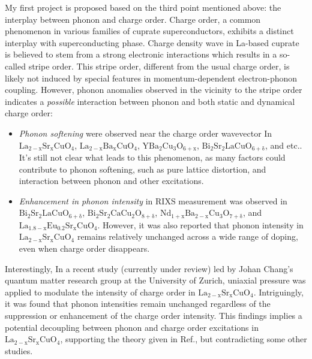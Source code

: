 \documentclass[11pt]{article}
\begin{document}
My first project is proposed based on the third point mentioned above: the interplay between phonon and charge order. Charge order, a common phenomenon in various families of cuprate superconductors, exhibits a distinct interplay with superconducting phase. Charge density wave in La-based cuprate is believed to stem from a strong electronic interactions which results in a so-called stripe order\cite{harriger_stripe_nodate,tranquada_evidence_1995,choi_disentangling_2020}. This stripe order, different from the usual charge order, is likely not induced by special features in momentum-dependent electron-phonon coupling. However, phonon anomalies observed in the vicinity to the stripe order indicates a \textit{possible} interaction between phonon and both static and dynamical charge order: 
\begin{itemize}
\item \textit{Phonon softening}  were observed near the charge order wavevector In $\mathrm{La_{2-x}Sr_{x}CuO_{4}}$\cite{lin_strongly_2020, wang_charge_2021, huang_quantum_2021}, $\mathrm{La_{2-x}Ba_{x}CuO_{4}}$\cite{miao_incommensurate_2018}, $\mathrm{YBa_{2}Cu_{3}O_{6+x}}$\cite{tacon_inelastic_2014}, $\mathrm{Bi_{2}Sr_{2}LaCuO_{6+\delta}}$\cite{li_multiorbital_2020}, and etc.. It's still not clear what leads to this phenomenon, as many factors could contribute to phonon softening, such as pure lattice distortion\cite{lin_strongly_2020}, and interaction between phonon and other excitations.  
\item \textit{Enhancement in phonon intensity}  in RIXS measurement was observed in $\mathrm{Bi_{2}Sr_{2}LaCuO_{6+\delta}}$\cite{li_multiorbital_2020}, $\mathrm{Bi_{2}Sr_{2}CaCu_{2}O_{8+\delta}}$\cite{chaix_dispersive_2017}, $\mathrm{Nd_{1+x}Ba_{2-x}Cu_{3}O_{7+\delta}}$\cite{braicovich_determining_2020}, and $\mathrm{La_{1.8-x}Eu_{0.2}Sr_xCuO_{4}}$\cite{peng_enhanced_2020,wang_charge_2021,huang_quantum_2021}. However, it was also reported that phonon intensity in $\mathrm{La_{2-x}Sr_{x}CuO_{4}}$ remains relatively unchanged across a wide range of doping, even when charge order disappears\cite{lin_strongly_2020}.  
\end{itemize}

Interestingly, In a recent study (currently under review) led by Johan Chang's quantum matter research group at the University of Zurich, uniaxial pressure was applied to modulate the intensity of charge order in $\mathrm{La_{2-x}Sr_{x}CuO_{4}}$. Intriguingly, it was found that phonon intensities remain unchanged regardless of the suppression or enhancement of the charge order intensity. This findings implies a potential decoupling between phonon and charge order excitations in $\mathrm{La_{2-x}Sr_{x}CuO_{4}}$, supporting the theory given in Ref.\cite{lin_strongly_2020}, but contradicting some other studies\cite{li_multiorbital_2020, chaix_dispersive_2017,huang_quantum_2021}. 
\end{document}
